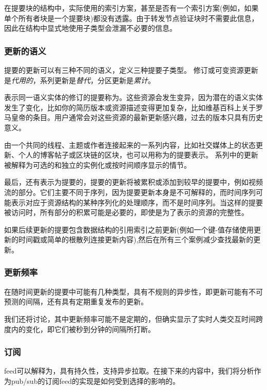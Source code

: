 在提要块的结构中，实际使用的索引方案，甚至是否有一个索引方案(例如，如果单个所有者块是一个提要块)都没有透露。由于转发节点验证块时不需要此信息，因此在结构中显式地使用子类型会泄漏不必要的信息。 

\subsubsection{更新的语义}

提要的更新可以有三种不同的语义，定义三种提要子类型。
修订或可变资源更新是\emph{代用的}，系列更新是\emph{替代}，分区更新是\emph{累计}。

表示同一语义实体的修订的提要称为。这些资源会发生变异，因为潜在的语义实体发生了变化，比如你的简历版本或资源描述变得更加复杂，比如维基百科上关于罗马皇帝的条目。用户通常会对这些资源的最新更新感兴趣，过去的版本只具有历史意义。

由一个共同的线程、主题或作者连接起来的一系列内容，比如社交媒体上的状态更新、个人的博客帖子或区块链的区块，也可以用称为的提要表示。
系列中的更新被解释为可选的和独立的实例化或按时间顺序显示的情节。

最后，还有表示为提要的，提要的更新将被累积或添加到较早的提要中，例如视频流的部分。它们主要不同于序列，因为提要更新本身是不可解释的，而时间序列可能表示对应于资源结构的某种序列化的处理顺序，而不是时间序列。当这样的提要被访问时，所有部分的积累可能是必要的，即使是为了表示的资源的完整性。

如果后续更新的提要包含数据结构的引用索引之前更新(例如一个键-值存储使用更新的时间戳或简单的根散列连接更新内容),然后在所有三个案例减少查找最新的更新。

\subsubsection{更新频率}

在随时间更新的提要中可能有几种类型，具有不规则的异步性，即更新可能有不可预测的间隔，还有具有定期重复发布的更新。

我们还将讨论，其中更新频率可能不是定期的，但确实显示了实时人类交互时间跨度内的变化，即它们被秒到分钟的间隔所打断。

\subsubsection{订阅}

feed可以解释为，具有持久性，支持异步拉取。在接下来的内容中，我们将分析作为pub/sub的订阅feed的实现是如何受到选择的影响的。

